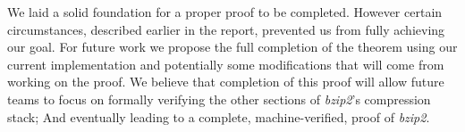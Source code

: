 \documentclass[11pt,letterpaper,]{article}
\begin{document}
We laid a solid foundation for a proper proof to be completed. However certain
circumstances, described earlier in the report, prevented us from fully
achieving our goal. For future work we propose the full completion of the
theorem using our current implementation and potentially some modifications
that will come from working on the proof. We believe that completion of this
proof will allow future teams to focus on formally verifying the other sections
of \emph{bzip2}'s compression stack; And eventually leading to a complete,
machine-verified, proof of \emph{bzip2}.


{}
\end{document}

